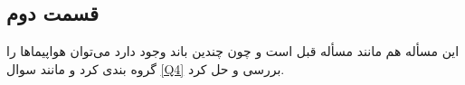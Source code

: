 \subsection{قسمت دوم}
این مسأله هم مانند مسأله قبل است و چون چندین باند وجود دارد می‌توان هواپیما‌ها را گروه بندی کرد و مانند سوال
\ref{Q4}
بررسی و حل کرد.